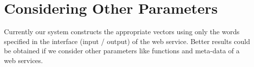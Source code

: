 \documentclass[12pt, twoside]{book}
\begin{document}
\section{Considering Other Parameters}
Currently our system constructs the appropriate vectors using only the words specified in the interface (input / output) of the web service. Better results could be obtained if we consider other parameters like functions and meta-data of a web services.

\pagebreak




\end{document}
